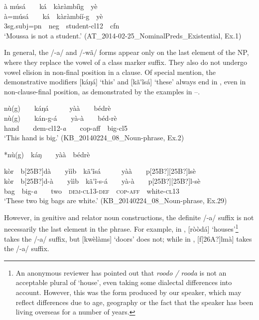 \documentclass[output=paper]{langsci/langscibook}
\begin{document}
\ea\label{ex:teo:20}
\label{bkm:Ref264216116}à músá\ \ \ \ ká\ \ kàràmbíìg\ \ yè\\
\gll à=músá\ \ \ \ ká\ \ kàràmbí\'{i}\nobreakdash-g\ \ yè\\
3sg.subj=pn\ \ neg\ \ student\nobreakdash-cl12\ \ cfn\\
\glt ‘Moussa is not a student.’ (AT\_2014-02-25\_NominalPreds\_Existential, Ex.1)
\z

In general, the /\nobreakdash-a/ and /\nobreakdash-wã/ forms appear only on the last element of the NP, where they replace the vowel of a class marker suffix. They also do not undergo vowel elision in non-final position in a clause. Of special mention, the demonstrative modifiers [k\'{a}ŋ\'{a}] ‘this’ and [k\~{a}\'{ }\~{i}sá] ‘these’ always end in \-[-a], even in non-clause-final position, as demonstrated by the examples in –.

\ea\label{ex:teo:21}
\label{bkm:Ref264213836}nù(g)\ \ \ \ káŋá\ \ \ \ \ \ y\`{a}à\ \ \ \ bédrè\\
\gll nù(g)\ \ \ \ kán\nobreakdash-g\nobreakdash-á\ \ \ \ yà-\`{a}\ \ \ \ béd\nobreakdash-rè\\
hand\ \ \ \ dem-cl12\nobreakdash-\textit{a}\ \ \ \ cop-aff\ \ big-cl5\ \ \\
\glt ‘This hand is big.’ (KB\_20140224\_08\_Noun-phrase, Ex.2)
\z

\ea\label{ex:teo:22}
*nù(g)\ \ káŋ\ \ \ \ yà\`{a}\ \ bédrè
\z

\ea\label{ex:teo:23}
\label{bkm:Ref264213846}kòr\ \ b[25B?]dà\ \ \ \ yììb\ \ k\~{a}\'{ }\~{i}sá\ \ \ \ \ \ yà\`{a}\ \ \ \ p[25B?][25B?]lsè\\
\gll kòr\ \ b[25B?]d\nobreakdash-à\ \ \ \ yììb\ \ k\~{a}\'{ }\~{i}\nobreakdash-s\nobreakdash-á\ \ \ \ yà-\`{a}\ \ \ \ p[25B?][25B?]l\nobreakdash-sè\\
bag\ \ big\nobreakdash-\textit{a}\ \ \ \ two\ \ \textsc{dem}\nobreakdash-\textsc{cl13\nobreakdash-}\textsc{def\ \ }\textsc{cop-aff}\ \ white\nobreakdash-\textsc{cl13}\\
\glt ‘These two big bags are white.’ (KB\_20140224\_08\_Noun-phrase, Ex.29)
\z

However, in genitive and relator noun constructions, the definite /-a/ suffix is not necessarily the last element in the phrase. For example, in , [ròòdá] ‘houses’\footnote{An anonymous reviewer has pointed out that \textit{roodo / rooda} is not an acceptable plural of ‘house’, even taking some dialectal differences into account. However, this was the form produced by our speaker, which may reflect differences due to age, geography or the fact that the speaker has been living overseas for a number of years.} takes the /\nobreakdash-a/ suffix, but [kwèlàms] ‘doors’ does not; while in , [f[26A?]lm\`{a}] takes the /-a/ suffix.
\end{document}
